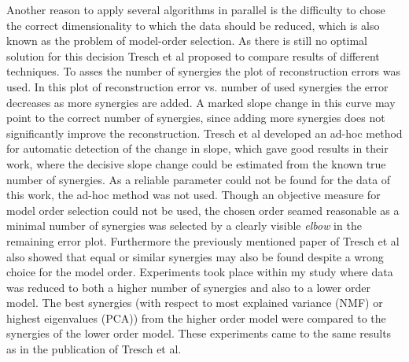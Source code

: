Another reason to apply several algorithms in parallel is the difficulty to chose the correct dimensionality to which the data should be reduced, which is also known as the problem of model-order selection. As there is still no optimal solution for this decision Tresch et al proposed to compare results of different techniques. To asses the number of synergies the plot of reconstruction errors was used. In this plot of reconstruction error vs. number of used synergies the error decreases as more synergies are added. A marked slope change in this curve may point to the correct number of synergies, since adding more synergies does not significantly improve the reconstruction. Tresch et al developed an ad-hoc method for automatic detection of the change in slope, which gave good results in their work, where the decisive slope change could be estimated from the known true number of synergies. As a reliable parameter could not be found for the data of this work, the ad-hoc method was not used. Though an objective measure for model order selection could not be used, the chosen order seamed reasonable as a minimal number of synergies was selected by a clearly visible \emph{elbow} in the remaining error plot. Furthermore the previously mentioned paper of Tresch et al also showed that equal or similar synergies may also be found despite a wrong choice for the model order. Experiments took place within my study where data was reduced to both a higher number of synergies and also to a lower order model. The best synergies (with respect to most explained variance (NMF) or highest eigenvalues (PCA)) from the higher order model were compared to the synergies of the lower order model. These experiments came to the same results as in the publication of Tresch et al.



